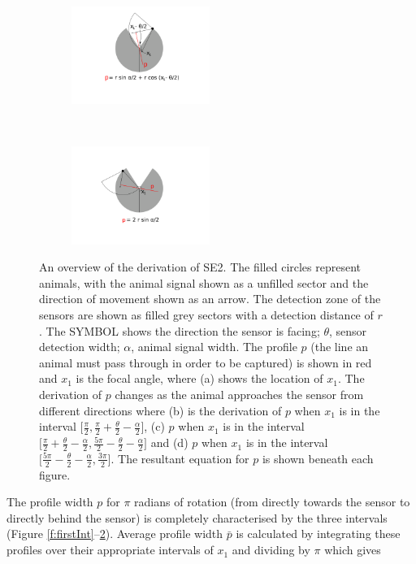 \documentclass[a4paper,10pt,reqno,oneside]{amsart}
\begin{document}
\begin{figure}[t]
	\begin{subfigure}[t]{60mm}
                \centering
		\includegraphics[width=45mm, trim= 6cm 6cm 6cm 1cm]{imgs/secondIntegral.pdf}
                \caption{}
                \label{f:secondInt}
        \end{subfigure}%
	~ 
	\begin{subfigure}[t]{60mm}
                \centering
		\includegraphics[width=45mm, trim= 6cm 6cm 6cm 1cm]{imgs/thirdIntegral.pdf}
                \caption{}
                \label{f:thirdInt}
        \end{subfigure}%
\label{f:x1AndInt}
\caption{An overview of the derivation of SE2. The filled circles represent animals, with the animal signal shown as a unfilled sector and the direction of movement shown as an arrow. The detection zone of the sensors are shown as filled grey sectors with a detection distance of $r$. The SYMBOL shows the direction the sensor is facing;  $\theta$, sensor detection width; $\alpha$, animal signal width. The profile $p$ (the line an animal must pass through in order to be captured) is shown in red and $x_1$ is the focal angle, where (a) shows the location of $x_1$. The derivation of $p$ changes as the animal approaches the sensor from different directions where (b) is the derivation of $p$ when $x_1$ is in the interval $\lbrack\frac{\pi}{2}, \frac{\pi}{2} + \frac{\theta}{2} - \frac{\alpha}{2}\rbrack$, (c)  $p$ when $x_1$ is in the interval $\lbrack\frac{\pi}{2} + \frac{\theta}{2} - \frac{\alpha}{2}, \frac{5 \pi}{2} - \frac{\theta}{2} - \frac{\alpha}{2} \rbrack$ and (d) $p$ when $x_1$ is in the interval $\lbrack\frac{5 \pi}{2} - \frac{\theta}{2} - \frac{\alpha}{2}, \frac{3 \pi}{2}\rbrack$. The resultant equation for $p$ is shown beneath each figure.}
\end{figure}

The profile width $p$ for $\pi$ radians of rotation (from directly towards the sensor to directly behind the sensor) is completely characterised by the three intervals (Figure \ref{f:firstInt}--\ref{f:thirdInt}). Average profile width $\bar{p}$ is calculated by integrating these profiles over their appropriate intervals of $x_1$ and dividing by $\pi$ which gives
\end{document}

